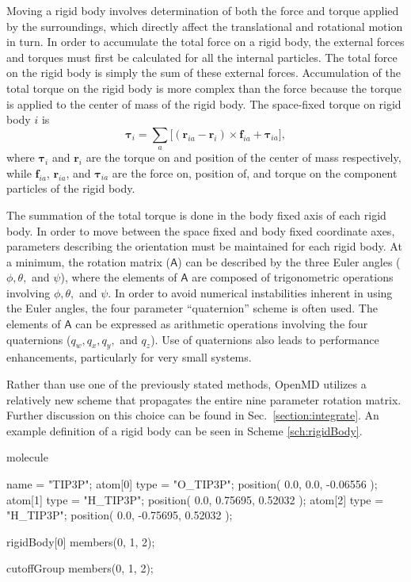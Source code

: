 \documentclass[letterpaper]{report}
\begin{document}
Moving a rigid body involves determination of both the force and
torque applied by the surroundings, which directly affect the
translational and rotational motion in turn. In order to accumulate
the total force on a rigid body, the external forces and torques must
first be calculated for all the internal particles. The total force on
the rigid body is simply the sum of these external forces.
Accumulation of the total torque on the rigid body is more complex
than the force because the torque is applied to the center of mass of
the rigid body. The space-fixed torque on rigid body $i$ is
\begin{equation}
\boldsymbol{\tau}_i=
	\sum_{a}\biggl[(\mathbf{r}_{ia}-\mathbf{r}_i)\times \mathbf{f}_{ia} 
	+ \boldsymbol{\tau}_{ia}\biggr],
\label{eq:torqueAccumulate}
\end{equation}
where $\boldsymbol{\tau}_i$ and $\mathbf{r}_i$ are the torque on and
position of the center of mass respectively, while $\mathbf{f}_{ia}$,
$\mathbf{r}_{ia}$, and $\boldsymbol{\tau}_{ia}$ are the force on,
position of, and torque on the component particles of the rigid body.

The summation of the total torque is done in the body fixed axis of
each rigid body. In order to move between the space fixed and body
fixed coordinate axes, parameters describing the orientation must be
maintained for each rigid body. At a minimum, the rotation matrix
($\mathsf{A}$) can be described by the three Euler angles ($\phi,
\theta,$ and $\psi$), where the elements of $\mathsf{A}$ are composed of
trigonometric operations involving $\phi, \theta,$ and
$\psi$.\cite{Goldstein01} In order to avoid numerical instabilities
inherent in using the Euler angles, the four parameter ``quaternion''
scheme is often used. The elements of $\mathsf{A}$ can be expressed as
arithmetic operations involving the four quaternions ($q_w, q_x, q_y,$
and $q_z$).\cite{Allen87} Use of quaternions also leads to
performance enhancements, particularly for very small
systems.\cite{Evans77}

Rather than use one of the previously stated methods, OpenMD
utilizes a relatively new scheme that propagates the entire nine
parameter rotation matrix. Further discussion on this choice can be
found in Sec.~\ref{section:integrate}. An example definition of a
rigid body can be seen in Scheme
\ref{sch:rigidBody}.

\begin{code}[caption={[Defining rigid bodies]A sample
definition of a molecule containing a rigid body and a cutoff
group},label={sch:rigidBody}] 
molecule{
  name = "TIP3P";
  atom[0]{
    type = "O_TIP3P";
    position( 0.0, 0.0, -0.06556 );
  }
  atom[1]{
    type = "H_TIP3P";
    position( 0.0, 0.75695, 0.52032 );
  }
  atom[2]{
    type = "H_TIP3P";
    position( 0.0, -0.75695, 0.52032 );
  }

  rigidBody[0]{
    members(0, 1, 2);
  }

  cutoffGroup{
    members(0, 1, 2);
  }
}
\end{code}
\end{document}
